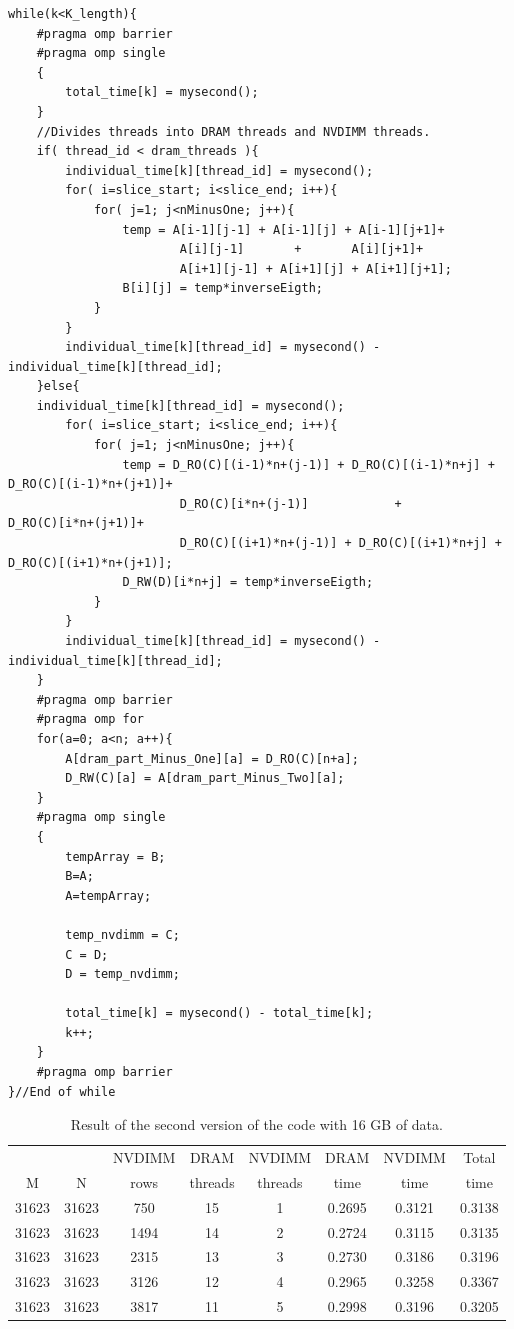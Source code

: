 \documentclass[12pt,a4paper,USenglish]{article}      %
\begin{document}
\begin{lstlisting}[caption=Second version of the code where the threads are using ghost array instead of accessing the other type of memory directly.]
while(k<K_length){
	#pragma omp barrier
	#pragma omp single
	{
		total_time[k] = mysecond();
	}
	//Divides threads into DRAM threads and NVDIMM threads.
	if( thread_id < dram_threads ){
		individual_time[k][thread_id] = mysecond();
		for( i=slice_start; i<slice_end; i++){
			for( j=1; j<nMinusOne; j++){
				temp = A[i-1][j-1] + A[i-1][j] + A[i-1][j+1]+
						A[i][j-1]       +       A[i][j+1]+
						A[i+1][j-1] + A[i+1][j] + A[i+1][j+1];
				B[i][j] = temp*inverseEigth;
			}
		}
		individual_time[k][thread_id] = mysecond() - individual_time[k][thread_id];
	}else{
	individual_time[k][thread_id] = mysecond();
		for( i=slice_start; i<slice_end; i++){
        	for( j=1; j<nMinusOne; j++){
        		temp = D_RO(C)[(i-1)*n+(j-1)] + D_RO(C)[(i-1)*n+j] + D_RO(C)[(i-1)*n+(j+1)]+
        				D_RO(C)[i*n+(j-1)]            +            D_RO(C)[i*n+(j+1)]+
        				D_RO(C)[(i+1)*n+(j-1)] + D_RO(C)[(i+1)*n+j] + D_RO(C)[(i+1)*n+(j+1)];
        		D_RW(D)[i*n+j] = temp*inverseEigth;
        	}
        }
		individual_time[k][thread_id] = mysecond() - individual_time[k][thread_id];
	}
	#pragma omp barrier
	#pragma omp for
	for(a=0; a<n; a++){
		A[dram_part_Minus_One][a] = D_RO(C)[n+a];
		D_RW(C)[a] = A[dram_part_Minus_Two][a];
	}
	#pragma omp single
	{
		tempArray = B;
		B=A;
		A=tempArray;

		temp_nvdimm = C;
		C = D;
		D = temp_nvdimm;

		total_time[k] = mysecond() - total_time[k];
		k++;
	}
	#pragma omp barrier
}//End of while
\end{lstlisting}


\begin{table}[!hbtp]
\begin{tabular}{ |c|c|c|c|c|c|c|c| }
\hline
&  & NVDIMM & DRAM & NVDIMM & DRAM & NVDIMM & Total \\
M & N & rows & threads & threads & time & time & time \\
\hline
31623 & 31623 & 750 & 15 & 1 & 0.2695 & 0.3121 & 0.3138 \\
\hline
31623 & 31623 & 1494 & 14 & 2 & 0.2724 & 0.3115 & 0.3135 \\
\hline
31623 & 31623 & 2315 & 13 & 3 & 0.2730 & 0.3186 & 0.3196 \\
\hline
31623 & 31623 & 3126 & 12 & 4 & 0.2965 & 0.3258 & 0.3367 \\
\hline
31623 & 31623 & 3817 & 11 & 5 & 0.2998 & 0.3196 & 0.3205 \\
\hline
\end{tabular}
\caption{Result of the second version of the code with 16 GB of data.}
\label{tab:SecondVersion16GB}
\end{table}
\end{document}
